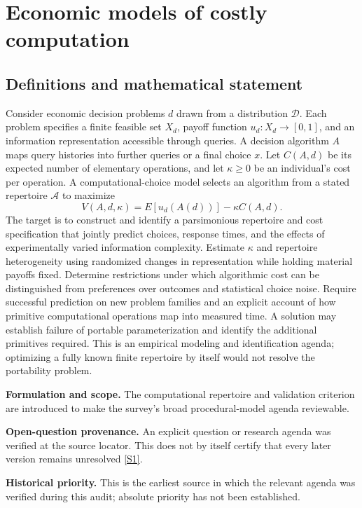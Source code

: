 \documentclass[11pt]{article}
\newcommand{\sref}[2]{\hyperlink{source:#1:#2}{[S#2]}}
\begin{document}
\section*{Economic models of costly computation}\label{30007556}
\subsection{Definitions and mathematical statement}
Consider economic decision problems \(d\) drawn from a distribution \(\mathcal D\). Each problem specifies a finite feasible set \(X_d\), payoff function \(u_d:X_d\to[0,1]\), and an information representation accessible through queries. A decision algorithm \(A\) maps query histories into further queries or a final choice \(x\). Let \(C(A,d)\) be its expected number of elementary operations, and let \(\kappa\geq0\) be an individual's cost per operation. A computational-choice model selects an algorithm from a stated repertoire \(\mathcal A\) to maximize
\[
 V(A,d,\kappa)=E[u_d(A(d))]-\kappa C(A,d).
\]
The target is to construct and identify a parsimonious repertoire and cost specification that jointly predict choices, response times, and the effects of experimentally varied information complexity. Estimate \(\kappa\) and repertoire heterogeneity using randomized changes in representation while holding material payoffs fixed. Determine restrictions under which algorithmic cost can be distinguished from preferences over outcomes and statistical choice noise. Require successful prediction on new problem families and an explicit account of how primitive computational operations map into measured time. A solution may establish failure of portable parameterization and identify the additional primitives required. This is an empirical modeling and identification agenda; optimizing a fully known finite repertoire by itself would not resolve the portability problem.

\par\textbf{Formulation and scope.} The computational repertoire and validation criterion are introduced to make the survey’s broad procedural-model agenda reviewable.

\par\textbf{Open-question provenance.} An explicit question or research agenda was verified at the source locator. This does not by itself certify that every later version remains unresolved \sref{30007556}{1}.

\par\textbf{Historical priority.} This is the earliest source in which the relevant agenda was verified during this audit; absolute priority has not been established.
\end{document}
